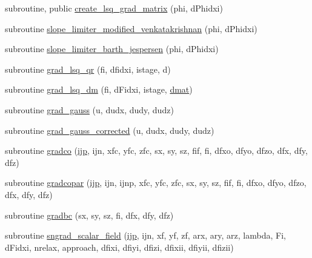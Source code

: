 \begin{DoxyCompactItemize}
\item 
subroutine, public \hyperlink{classgradients_a89f491e7b33a1042b176ce9cbf6cbea7}{create\-\_\-lsq\-\_\-grad\-\_\-matrix} (phi, d\-Phidxi)
\item 
subroutine \hyperlink{classgradients_af8d86227570d2a05536bc966c46f3fef}{slope\-\_\-limiter\-\_\-modified\-\_\-venkatakrishnan} (phi, d\-Phidxi)
\item 
subroutine \hyperlink{classgradients_ab7860442796eb435f5c34667b8c7c008}{slope\-\_\-limiter\-\_\-barth\-\_\-jespersen} (phi, d\-Phidxi)
\item 
subroutine \hyperlink{classgradients_a524feb6c9302fc86d0189ad33cf7485c}{grad\-\_\-lsq\-\_\-qr} (fi, dfidxi, istage, d)
\item 
subroutine \hyperlink{classgradients_abf08289bb8d57d8177f75a1028008906}{grad\-\_\-lsq\-\_\-dm} (fi, d\-Fidxi, istage, \hyperlink{classgradients_a0417bd090ffd38c01cbcc0d76068dd82}{dmat})
\item 
subroutine \hyperlink{classgradients_a79da9651b35bd925b488cb7cff3abb7f}{grad\-\_\-gauss} (u, dudx, dudy, dudz)
\item 
subroutine \hyperlink{classgradients_a01a46b4478e35c25121d4ad506c757fc}{grad\-\_\-gauss\-\_\-corrected} (u, dudx, dudy, dudz)
\item 
subroutine \hyperlink{classgradients_a437864d9f0535f851ceb4272b256f4ea}{gradco} (\hyperlink{CourantNo_8h_accea320a458bb8759c7ece360e05ddf4}{ijp}, ijn, xfc, yfc, zfc, sx, sy, sz, fif, fi, dfxo, dfyo, dfzo, dfx, dfy, dfz)
\item 
subroutine \hyperlink{classgradients_a95333310c398e2b695c12e0d388000d9}{gradcopar} (\hyperlink{CourantNo_8h_accea320a458bb8759c7ece360e05ddf4}{ijp}, ijn, ijnp, xfc, yfc, zfc, sx, sy, sz, fif, fi, dfxo, dfyo, dfzo, dfx, dfy, dfz)
\item 
subroutine \hyperlink{classgradients_abd2236c107f7c7c31c3f7fb638bb7b21}{gradbc} (sx, sy, sz, fi, dfx, dfy, dfz)
\item 
subroutine \hyperlink{classgradients_adcec95a6cfc9fbeb540b8a4a457bb2c6}{sngrad\-\_\-scalar\-\_\-field} (\hyperlink{CourantNo_8h_accea320a458bb8759c7ece360e05ddf4}{ijp}, ijn, xf, yf, zf, arx, ary, arz, lambda, Fi, d\-Fidxi, nrelax, approach, dfixi, dfiyi, dfizi, dfixii, dfiyii, dfizii)
\end{DoxyCompactItemize}
